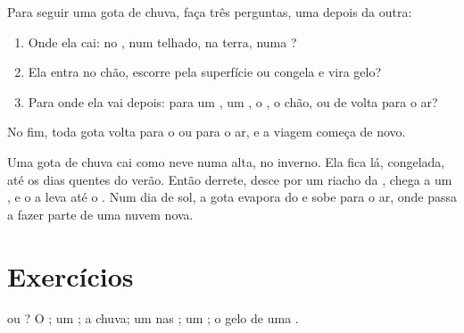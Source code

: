 \begin{method}\label{met:g2:water-on-earth:drop}
Para seguir uma gota de chuva, faça três perguntas, uma depois da outra:
\begin{enumerate}
  \item Onde ela cai: no , num telhado, na terra, numa ?
  \item Ela entra no chão, escorre pela superfície ou congela e vira gelo?
  \item Para onde ela vai depois: para um , um , o , o chão, ou
        de volta para o ar?
\end{enumerate}
No fim, toda gota volta para o  ou para o ar, e a viagem começa de
novo.
\end{method}

\begin{example}\label{ex:g2:water-on-earth:mountain}
Uma gota de chuva cai como neve numa  alta, no inverno. Ela fica
lá, congelada, até os dias quentes do verão. Então derrete, desce por um
riacho da , chega a um , e o  a leva até o . Num dia de
sol, a gota evapora do  e sobe para o ar, onde passa a fazer parte de
uma nuvem nova.
\end{example}

\section{Exercícios}

\begin{exercise}[$\star$]\label{exo:g2:water-on-earth:1}
 ou ? O ; um ; a chuva; um  nas
; um ; o gelo de uma .
\end{exercise}

